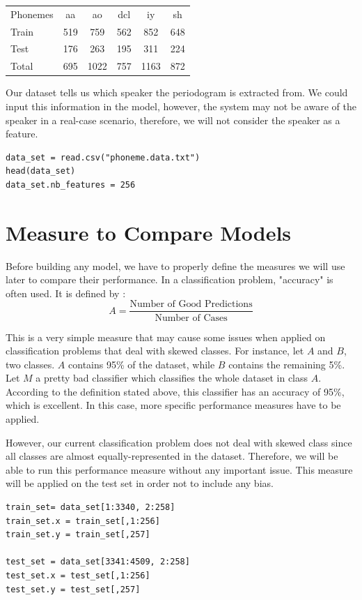 \documentclass[]{report}
\begin{document}
\begin{center}
\begin{tabular}{l c c c c c}
 Phonemes	 & aa &  ao & dcl & iy & sh \\
Train & 519 & 759 & 562 & 852 & 648\\
Test  & 176 & 263 & 195 & 311 & 224\\
Total & 695 & 1022 & 757 & 1163 & 872
\end{tabular}
\end{center}

Our dataset tells us which speaker the periodogram is extracted from. We could input this information in the model, however, the system may not be aware of the speaker in a real-case scenario, therefore, we will not consider the speaker as a feature. 

\begin{lstlisting}
data_set = read.csv("phoneme.data.txt")
head(data_set)
data_set.nb_features = 256
\end{lstlisting}

\section{Measure to Compare Models}
Before building any model, we have to properly define the measures we will use later to compare their performance. In a classification problem, "accuracy" is often used. It is defined by :
$$
	A = \frac{\text{Number of Good Predictions}}{\text{Number of Cases}}
$$

This is a very simple measure that may cause some issues when applied on classification problems that deal with skewed classes. For instance, let $A$ and $B$, two classes. $A$ contains 95\% of the dataset, while $B$ contains the remaining 5\%. Let $M$ a pretty bad classifier which classifies the whole dataset in class $A$. According to the definition stated above, this classifier has an accuracy of 95\%, which is excellent. In this case, more specific performance measures have to be applied.

However, our current classification problem does not deal with skewed class since all classes are almost equally-represented in the dataset. Therefore, we will be able to run this performance measure without any important issue. This measure will be applied on the test set in order not to include any bias.

\begin{lstlisting}
train_set= data_set[1:3340, 2:258]
train_set.x = train_set[,1:256]
train_set.y = train_set[,257]

test_set = data_set[3341:4509, 2:258]
test_set.x = test_set[,1:256]
test_set.y = test_set[,257]
\end{lstlisting}
\end{document}
